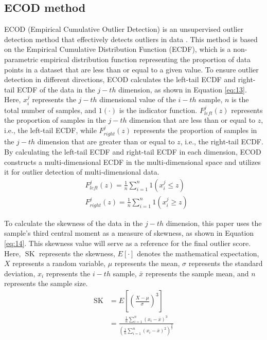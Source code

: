 \documentclass[3p,authoryear,preprint,12pt]{elsarticle}
\begin{document}
\subsection{ECOD method}
ECOD (Empirical Cumulative Outlier Detection) is an unsupervised outlier detection method that effectively detects outliers in data \citep{LiECODUnsupervisedOutlier2022}. This method is based on the Empirical Cumulative Distribution Function (ECDF), which is a non-parametric empirical distribution function representing the proportion of data points in a dataset that are less than or equal to a given value. To ensure outlier detection in different directions, ECOD calculates the left-tail ECDF and right-tail ECDF of the data in the  $j-th$ dimension, as shown in Equation \ref{eq:13}. Here, $x_i^j$ represents the  $j-th$ dimensional value of the  $i-th$ sample, $n$  is the total number of samples, and $1(\cdot)$  is the indicator function. $F_{left}^j(z)$  represents the proportion of samples in the  $j-th$ dimension that are less than or equal to $z$, i.e., the left-tail ECDF, while  $F_{right}^j(z)$  represents the proportion of samples in the  $j-th$ dimension that are greater than or equal to $z$, i.e., the right-tail ECDF. By calculating the left-tail ECDF and right-tail ECDF in each dimension, ECOD constructs a multi-dimensional ECDF in the multi-dimensional space and utilizes it for outlier detection of multi-dimensional data.
\begin{equation}
	\label{eq:13}
	\begin{split}
		&F_{left}^j(z) =  \frac{1}{n}\sum_{i=1}^{n} 1 (x_i^j \leq z) \\
		&F_{right}^j(z) =  \frac{1}{n}\sum_{i=1}^{n} 1 (x_i^j \geq z) 
	\end{split}
\end{equation}

To calculate the skewness of the data in the  $j-th$ dimension, this paper uses the sample's third central moment as a measure of skewness, as shown in Equation \ref{eq:14}. This skewness value will serve as a reference for the final outlier score. Here, $\operatorname{SK}$  represents the skewness, $E\left[\cdot \right]$ denotes the mathematical expectation, $X$ represents a random variable,  $\mu$ represents the mean, $\sigma$  represents the standard deviation, $x_i$  represents the  $i-th$ sample,  $\bar{x}$ represents the sample mean, and {$n$} represents the sample size.
\begin{equation}
	\label{eq:14}
	\begin{split}
		\operatorname{SK}
		& = E\left[ \left( \frac{X-\mu}{\sigma}\right)^3 \right]  \\
		&= \frac{\frac{1}{n} \sum_{i=1}^{n} (x_i - \bar{x})^3}{\left(\frac{1}{n} \sum_{i=1}^{n} (x_i - \bar{x})^2\right)^{\frac{3}{2}}}
	\end{split}
\end{equation} 
\end{document}

